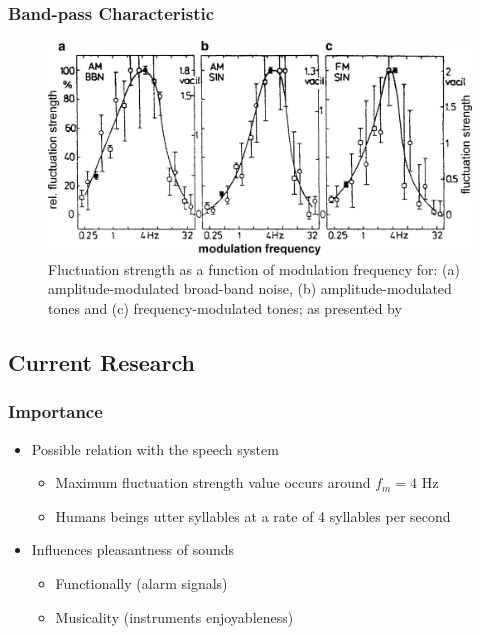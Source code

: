 \documentclass{beamer}
\begin{document}
\begin{frame}
  \frametitle{Band-pass Characteristic}
  \begin{figure}
    \includegraphics[width=\textwidth]{fs_vs_md}
    \caption{Fluctuation strength as a function of modulation frequency for: (a)
      amplitude-modulated broad-band noise, (b) amplitude-modulated tones and
      (c) frequency-modulated tones; as presented by
      \citet{Fastl2007Psychoacoustics}}
  \end{figure}
\end{frame}

\subsection{Current Research}

\begin{frame}
  \frametitle{Importance}
  \begin{itemize}
    \item Possible relation with the speech system
    \begin{itemize}
      \item Maximum fluctuation strength value occurs around $f_m = 4$ Hz
      \item Humans beings utter syllables at a rate of 4 syllables per second
    \end{itemize}
    \item Influences pleasantness of sounds
    \begin{itemize}
      \item Functionally (alarm signals)
      \item Musicality (instruments enjoyableness)
    \end{itemize}
  \end{itemize}
\end{frame}
\end{document}
